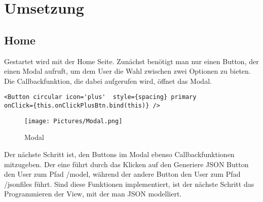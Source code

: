 \documentclass[a4paper,11pt]{scrreprt}
\begin{document}
\chapter{Umsetzung}
\section{Home}
Gestartet wird mit der Home Seite. Zunächst benötigt man nur einen Button, der einen Modal aufruft, um dem User die Wahl zwischen zwei Optionen zu bieten. Die Callbackfunktion, die dabei aufgerufen wird, öffnet das Modal. 
\begin{lstlisting}
<Button circular icon='plus'  style={spacing} primary
onClick={this.onClickPlusBtn.bind(this)} />
\end{lstlisting}
\begin{figure}[ht]
\centering
\texttt{[image: Pictures/Modal.png]}
\caption{Modal}
\label{Modal}
\end{figure}
\hfill \break
Der nächste Schritt ist, den Buttons im Modal ebenso Callbackfunktionen mitzugeben. Der eine führt durch das Klicken auf den Generiere JSON Button den User zum Pfad /model, während der andere Button den User zum Pfad /jsonfiles führt. Sind diese Funktionen implementiert, ist der nächste Schritt das Programmieren der View, mit der man JSON modelliert. 
\hfill \break
\hfill \break
\hfill \break
\hfill \break
\end{document}
